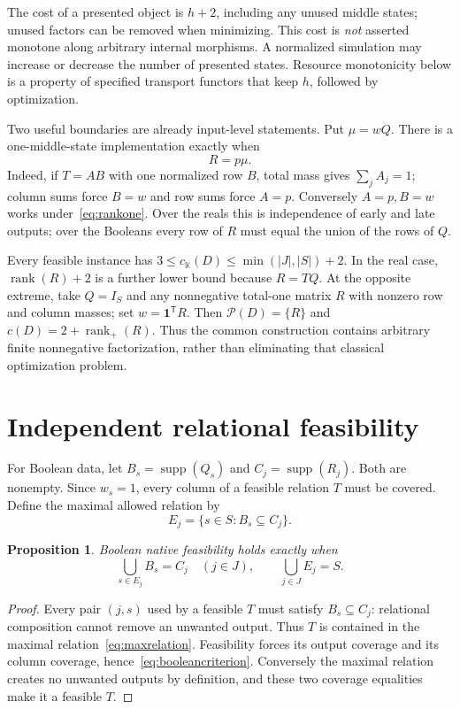 \documentclass[11pt]{article}
\newcommand{\K}{\mathbb K}
\newcommand{\one}{\mathbf 1}
\newcommand{\supp}{\operatorname{supp}}
\newcommand{\rk}{\operatorname{rank}}
\newcommand{\Pcal}{\mathcal P}
\newtheorem{proposition}[theorem]{Proposition}
\theoremstyle{remark}
\begin{document}
The cost of a presented object is $h+2$, including any unused middle states; unused factors can be removed when minimizing. This cost is \emph{not} asserted monotone along arbitrary internal morphisms. A normalized simulation may increase or decrease the number of presented states. Resource monotonicity below is a property of specified transport functors that keep $h$, followed by optimization.

Two useful boundaries are already input-level statements. Put $\mu=wQ$. There is a one-middle-state implementation exactly when
\begin{equation}\label{eq:rankone}
 R=p\mu.
\end{equation}
Indeed, if $T=AB$ with one normalized row $B$, total mass gives $\sum_jA_j=1$; column sums force $B=w$ and row sums force $A=p$. Conversely $A=p,B=w$ works under~\eqref{eq:rankone}. Over the reals this is independence of early and late outputs; over the Booleans every row of $R$ must equal the union of the rows of $Q$.

Every feasible instance has $3\le c_\K(D)\le\min(|J|,|S|)+2$. In the real case, $\rk(R)+2$ is a further lower bound because $R=TQ$. At the opposite extreme, take $Q=I_S$ and any nonnegative total-one matrix $R$ with nonzero row and column masses; set $w=\one^{\mathsf T}R$. Then $\Pcal(D)=\{R\}$ and $c(D)=2+\rk_+(R)$. Thus the common construction contains arbitrary finite nonnegative factorization, rather than eliminating that classical optimization problem.

\section{Independent relational feasibility}

For Boolean data, let $B_s=\supp(Q_s)$ and $C_j=\supp(R_j)$. Both are nonempty. Since $w_s=1$, every column of a feasible relation $T$ must be covered. Define the maximal allowed relation by
\begin{equation}\label{eq:maxrelation}
 E_j=\{s\in S:B_s\subseteq C_j\}.
\end{equation}

\begin{proposition}\label{prop:boolean}
Boolean native feasibility holds exactly when
\begin{equation}\label{eq:booleancriterion}
 \bigcup_{s\in E_j}B_s=C_j\quad(j\in J),
 \qquad \bigcup_{j\in J}E_j=S.
\end{equation}
\end{proposition}
\begin{proof}
Every pair $(j,s)$ used by a feasible $T$ must satisfy $B_s\subseteq C_j$: relational composition cannot remove an unwanted output. Thus $T$ is contained in the maximal relation~\eqref{eq:maxrelation}. Feasibility forces its output coverage and its column coverage, hence~\eqref{eq:booleancriterion}. Conversely the maximal relation creates no unwanted outputs by definition, and these two coverage equalities make it a feasible $T$.
\end{proof}
\end{document}
